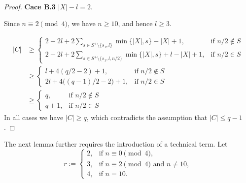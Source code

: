 \documentclass{article}
\begin{document}
\begin{proof}
{\bf Cace B.3}  $|X|- l=2$.

Since $n \equiv 2 \pmod{4}$, we have $n \ge 10$, and hence $l \ge 3$.

\begin{align*}
|C| &\geq 
\begin{cases}
\displaystyle 2 + 2l + 2\sum_{s\in S^+\setminus\{s_1,l\}} \min\{|X|,s\} - |X| + 1, & \text{if } n/2\notin S\\[4pt]
\displaystyle 2 + 2l + 2\sum_{s\in S^+\setminus\{s_1,l,n/2\}} \min\{|X|,s\} + l - |X| + 1, & \text{if } n/2\in S
\end{cases} \\
&\geq 
\begin{cases}
\displaystyle l + 4(q/2-2) + 1, & \text{if } n/2\notin S\\[4pt]
\displaystyle 2l + 4\big((q-1)/2-2\big) + 1, & \text{if } n/2\in S
\end{cases} \\
&\geq 
\begin{cases}
\displaystyle q, & \text{if } n/2\notin S\\[4pt]
\displaystyle q + 1, & \text{if } n/2\in S
\end{cases}
\end{align*}
In all cases we have $|C| \ge q$, which contradicts the assumption that $|C| \leq q-1$.
\end{proof}

The next lemma further requires the introduction of a technical term. Let
\[
r := 
\begin{cases}
2, & \text{if } n \equiv 0 \pmod{4},\\[2pt]
3, & \text{if } n \equiv 2 \pmod{4} \text{ and } n\neq 10,\\[2pt]
4, & \text{if } n = 10.
\end{cases}
\]
\end{document}
